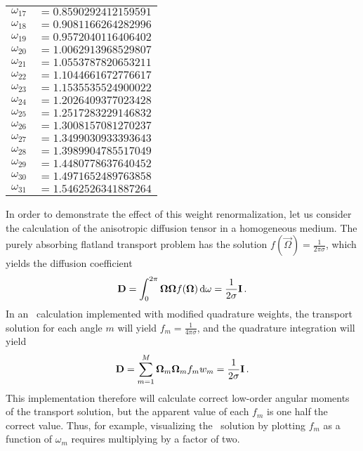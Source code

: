 \begin{table}[p]
\begin{minipage}[t]{3in}
\begin{tabular}{l@{}l}
$\omega_{17}$ & ${}=0.8590292412159591$ \\
$\omega_{18}$ & ${}=0.9081166264282996$ \\
$\omega_{19}$ & ${}=0.9572040116406402$ \\
$\omega_{20}$ & ${}=1.0062913968529807$ \\
$\omega_{21}$ & ${}=1.0553787820653211$ \\
$\omega_{22}$ & ${}=1.1044661672776617$ \\
$\omega_{23}$ & ${}=1.1535535524900022$ \\
$\omega_{24}$ & ${}=1.2026409377023428$ \\
$\omega_{25}$ & ${}=1.2517283229146832$ \\
$\omega_{26}$ & ${}=1.3008157081270237$ \\
$\omega_{27}$ & ${}=1.3499030933393643$ \\
$\omega_{28}$ & ${}=1.3989904785517049$ \\
$\omega_{29}$ & ${}=1.4480778637640452$ \\
$\omega_{30}$ & ${}=1.4971652489763858$ \\
$\omega_{31}$ & ${}=1.5462526341887264$ \\
\bottomrule
\end{tabular}%
\end{minipage}%
  \label{tab:chebyQs}
\end{table}

In order to demonstrate the effect of this weight renormalization, let us
consider the calculation of the anisotropic diffusion tensor
in a homogeneous medium.  The purely absorbing flatland transport problem has the
solution $f(\vec{\Omega}) = \frac{1}{2\pi\sigma}$, which yields the diffusion
coefficient
\begin{equation*}
  \mathbf{D} = \int_{0}^{2\pi} \bm{\Omega}\bm{\Omega} f(\bm{\Omega}) \mathop{}\!\mathrm{d} \omega
  = \frac{1}{2\sigma} \mathbf{I} \,.
\end{equation*}
In an \SN\ calculation implemented with modified quadrature weights, the
transport solution for each angle $m$ will yield $f_m = \frac{1}{4\pi\sigma}$,
and the quadrature integration will yield
\begin{equation*}
  \mathbf{D} = \sum_{m=1}^{M} \bm{\Omega}_m \bm{\Omega}_m f_m  w_m 
  = \frac{1}{2\sigma} \mathbf{I} \,.
\end{equation*}
This implementation therefore will calculate correct low-order angular moments of
the transport solution, but the apparent value of each $f_m$ is one half 
the correct value. Thus, for example, visualizing the \SN\
solution by plotting $f_m$ as a function of $\omega_m$ requires multiplying by a
factor of two.

